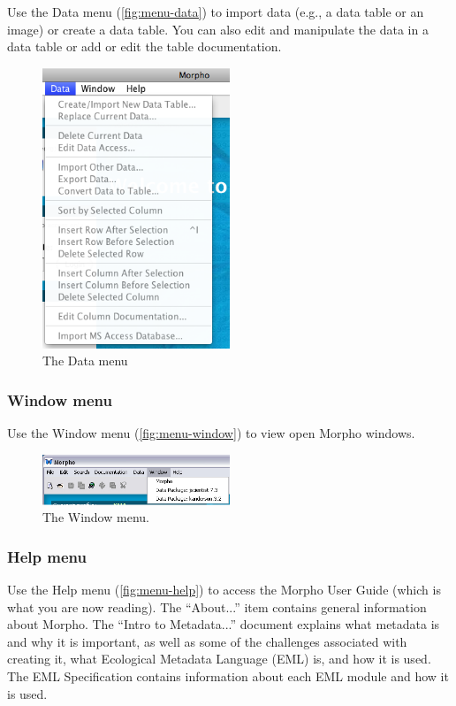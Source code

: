 Use the Data menu (\autoref{fig:menu-data}) to import data (e.g., a data
table or an image) or create a data table. You can also edit and
manipulate the data in a data table or add or edit the table
documentation. 

\begin{figure}
  \centering
    \includegraphics[width=0.5\textwidth]{images/menu-data.png}
  \caption{The Data menu}
  \label{fig:menu-data}
\end{figure}

\subsubsection{Window menu} \label{sec:menu-window}

Use the Window menu (\autoref{fig:menu-window}) to view open Morpho
windows. 

\begin{figure}
  \centering
    \includegraphics[width=0.5\textwidth]{images/menu-window.jpg}
  \caption{The Window menu.}
  \label{fig:menu-window}
\end{figure}

\subsubsection{Help menu} \label{sec:menu-help}

Use the Help menu (\autoref{fig:menu-help}) to access the Morpho User
Guide (which is what you are now reading). The ``About...'' item
contains general information about Morpho. The ``Intro to Metadata...''
document explains what metadata is and why it is important, as well as
some of the challenges associated with creating it, what Ecological
Metadata Language (EML) is, and how it is used. The EML Specification
contains information about each EML module and how it is used.

